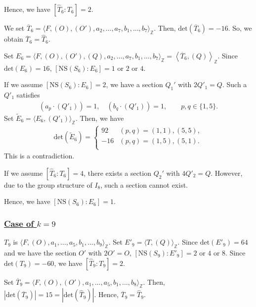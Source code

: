 \documentclass[10pt]{article}
\begin{document}
Hence, we have
$\left[\widehat{T}_6:T_6\right]=2$.


We set $\overline{T}_6=\langle F,(O),(O'),a_2,\dots,a_7,b_1,\dots,b_7\rangle_\mathbb{Z} $.
Then, $\mathrm{det}\left(\overline{T}_6\right)=-16$.
So,
we obtain $\overline{T}_6=\widehat{T}_6$.

Set
$E_6=\langle F,(O),(O'),(Q),a_2,\dots,a_7,b_1,\dots,b_7\rangle_\mathbb{Z} =\left\langle \overline{T}_6,(Q) \right\rangle_\mathbb{Z} $.
Since $\mathrm{det}(E_6)=16$,
$[\mathrm{NS}(S_6):E_6]=1 \text{ or } 2 \text{ or } 4$.


If we assume
$[\mathrm{NS}(S_6):E_6]=2$,
we have a section $Q_1'$ with $2Q'_1=Q$.
Such a $Q'_1$ satisfies
\begin{align*}
(a_p\cdot (Q'_1)) = 1, \quad  (b_q \cdot (Q'_1))  = 1, 
\quad\quad p,q \in \{ 1,5 \}.
\end{align*}
Set
$\widetilde{E}_6=\langle E_6,(Q'_1)\rangle_\mathbb{Z} $.
Then, we have
\begin{align*}
\mathrm{det}\left(\widetilde{E}_6\right)=
\begin{cases}
92   & (p,q)=(1,1),(5,5),\\ 
-16   & (p,q)=(1,5),(5,1).\\
\end{cases}
\end{align*}
This is a contradiction.

If we assume $\left[\widehat{T}_6:T_6\right]=4$,
there exists a section $Q_2'$ with $4Q'_2=Q$.
However, due to the group structure of $I_8$,
such a section cannot exist.

Hence, we have $[\mathrm{NS}(S_6):E_6]=1$.








\subsubsection*{\underline{Case   of  $k=9$}}


$T_9$ is $\langle F,(O),a_1,\dots,a_5,b_1,\dots,b_9\rangle_\mathbb{Z} $.
Set $E'_9=\langle T,(Q) \rangle_\mathbb{Z}$.
Since $\mathrm{det}(E'_9)=64$ and we have the section $O'$ with $2O'=O$,
$[\mathrm{NS}(S_9):E'_9]=2 \text{ or } 4 \text{ or } 8$.
Since
$\mathrm{det}(T_9)=-60$,
we have $\left[\widehat{T}_9:T_9\right]=2$.

Set $\overline{T}_9=\langle F,(O),(O'),a_1,\dots,a_5,b_1,\dots,b_8\rangle_\mathbb{Z} .$
Then, $|\mathrm{det}\left(\overline{T}_9\right)|=15=|\mathrm{det}\left(\widehat{T}_9\right)|$.
Hence, $\overline{T}_9=\widehat{T}_9$.
\end{document}

